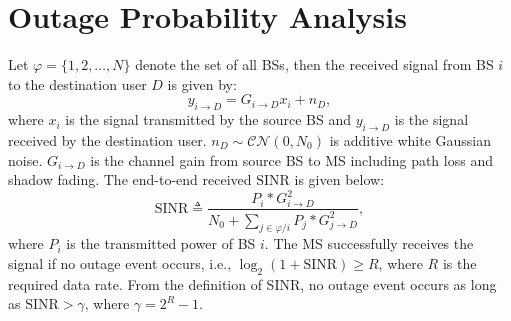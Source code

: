 \documentclass[journal,10pt]{IEEEtran}
\begin{document}
 \section{Outage Probability Analysis}
 \label{OutageProb}
 \par Let $\varphi = \{1, 2, \dots, N\}$ denote the set of all BSs, then the received signal from BS $i$ to the destination user $D$ is given by:
 \begin{equation}
 y_{i\to D} = G_{i\to D}x_{i}+n_{D},
 \end{equation}
 where $x_{i}$ is the signal transmitted by the source BS and $y_{i\to D}$ is the signal received by the destination user. $n_{D}\sim \mathcal{CN}(0,N_{0})$ is additive white Gaussian noise. $G_{i\to D}$ is the channel gain from source BS to MS including path loss and shadow fading. The end-to-end received $\text{SINR}$ is given below:
 \begin{equation}
 \text{SINR} \triangleq \frac{P_{i}*G_{i\to D}^{2}}{N_{0}+\sum_{j\in \varphi/i}P_{j}*G_{j\to D}^2},
 \end{equation}
 where $P_{i}$ is the transmitted power of BS $i$. The MS successfully receives the signal if no outage event occurs, i.e., $\log_{2}(1+\text{SINR})\ge R$, where $R$ is the required data rate. From the definition of SINR, no outage event occurs as long as $\text{SINR} > \gamma$, where $\gamma = 2^{R}-1$.
\end{document}
